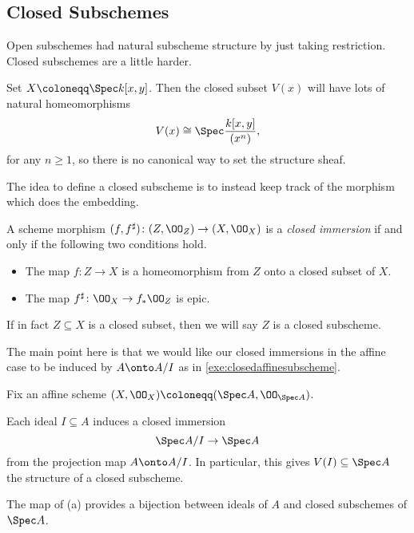 \documentclass[../notes.tex]{subfiles}
\begin{document}
\subsection{Closed Subschemes}
Open subschemes had natural subscheme structure by just taking restriction. Closed subschemes are a little harder.
\begin{example}
	Set $X\coloneqq\Spec k[x,y]$. Then the closed subset $V(x)$ will have lots of natural homeomorphisms
	\[V(x)\cong\Spec\frac{k[x,y]}{(x^n)},\]
	for any $n\ge1$, so there is no canonical way to set the structure sheaf.
\end{example}
The idea to define a closed subscheme is to instead keep track of the morphism which does the embedding.
\begin{definition}
	A scheme morphism $(f,f^\sharp)\colon(Z,\OO_Z)\to(X,\OO_X)$ is a \textit{closed immersion} if and only if the following two conditions hold.
	\begin{itemize}
		\item The map $f\colon Z\to X$ is a homeomorphism from $Z$ onto a closed subset of $X$.
		\item The map $f^\sharp\colon\OO_X\to f_*\OO_Z$ is epic.
	\end{itemize}
	If in fact $Z\subseteq X$ is a closed subset, then we will say $Z$ is a closed subscheme.
\end{definition}
The main point here is that we would like our closed immersions in the affine case to be induced by $A\onto A/I$ as in \autoref{exe:closedaffinesubscheme}.
\begin{proposition} \label{prop:affineclosedsubschemes}
	Fix an affine scheme $(X,\OO_X)\coloneqq(\Spec A,\OO_{\Spec A})$.
	\begin{listalph}
		\item Each ideal $I\subseteq A$ induces a closed immersion
		\[\Spec A/I\to\Spec A\]
		from the projection map $A\onto A/I$. In particular, this gives $V(I)\subseteq\Spec A$ the structure of a closed subscheme.
		\item The map of (a) provides a bijection between ideals of $A$ and closed subschemes of $\Spec A$.
	\end{listalph}
\end{proposition}
\end{document}
